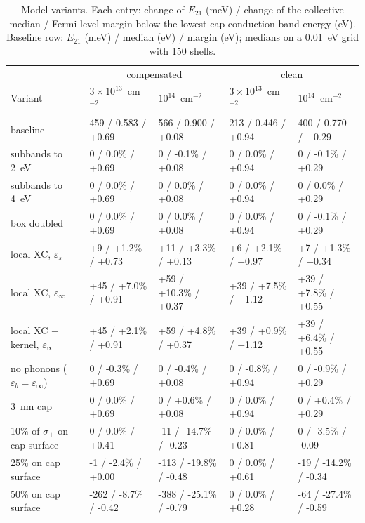 \documentclass[11pt]{article}
\begin{document}
\begin{table}[h]
\centering\footnotesize
\caption{Model variants. Each entry: change of $E_{21}$ (meV) / change of the collective median / Fermi-level margin below the lowest cap conduction-band energy (eV). Baseline row: $E_{21}$ (meV) / median (eV) / margin (eV); medians on a 0.01~eV grid with 150 shells.}\label{tab:checks}
\begin{tabular}{lllll}
\toprule
 & \multicolumn{2}{c}{compensated} & \multicolumn{2}{c}{clean} \\
Variant & $3\times10^{13}$~cm$^{-2}$ & $10^{14}$~cm$^{-2}$ & $3\times10^{13}$~cm$^{-2}$ & $10^{14}$~cm$^{-2}$ \\
\midrule
baseline & 459 / 0.583 / +0.69 & 566 / 0.900 / +0.08 & 213 / 0.446 / +0.94 & 400 / 0.770 / +0.29 \\
subbands to 2~eV & 0 / 0.0\% / +0.69 & 0 / -0.1\% / +0.08 & 0 / 0.0\% / +0.94 & 0 / -0.1\% / +0.29 \\
subbands to 4~eV & 0 / 0.0\% / +0.69 & 0 / 0.0\% / +0.08 & 0 / 0.0\% / +0.94 & 0 / 0.0\% / +0.29 \\
box doubled & 0 / 0.0\% / +0.69 & 0 / 0.0\% / +0.08 & 0 / 0.0\% / +0.94 & 0 / -0.1\% / +0.29 \\
local XC, $\varepsilon_s$ & +9 / +1.2\% / +0.73 & +11 / +3.3\% / +0.13 & +6 / +2.1\% / +0.97 & +7 / +1.3\% / +0.34 \\
local XC, $\varepsilon_\infty$ & +45 / +7.0\% / +0.91 & +59 / +10.3\% / +0.37 & +39 / +7.5\% / +1.12 & +39 / +7.8\% / +0.55 \\
local XC + kernel, $\varepsilon_\infty$ & +45 / +2.1\% / +0.91 & +59 / +4.8\% / +0.37 & +39 / +0.9\% / +1.12 & +39 / +6.4\% / +0.55 \\
no phonons ($\varepsilon_b=\varepsilon_\infty$) & 0 / -0.3\% / +0.69 & 0 / -0.4\% / +0.08 & 0 / -0.8\% / +0.94 & 0 / -0.9\% / +0.29 \\
3~nm cap & 0 / 0.0\% / +0.69 & 0 / +0.6\% / +0.08 & 0 / 0.0\% / +0.94 & 0 / +0.4\% / +0.29 \\
10\% of $\sigma_+$ on cap surface & 0 / 0.0\% / +0.41 & -11 / -14.7\% / -0.23 & 0 / 0.0\% / +0.81 & 0 / -3.5\% / -0.09 \\
25\% on cap surface & -1 / -2.4\% / +0.00 & -113 / -19.8\% / -0.48 & 0 / 0.0\% / +0.61 & -19 / -14.2\% / -0.34 \\
50\% on cap surface & -262 / -8.7\% / -0.42 & -388 / -25.1\% / -0.79 & 0 / 0.0\% / +0.28 & -64 / -27.4\% / -0.59 \\
\bottomrule
\end{tabular}
\end{table}




\end{document}
